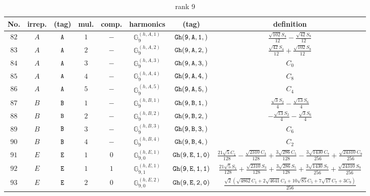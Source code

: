 \documentclass[fleqn,8pt]{jsarticle}
\begin{document}
\begin{table}[ht!]
\begin{center}
\caption{rank 9}
\renewcommand{\arraystretch}{1.3}
\begin{tabular}{cccccccc} \hline \hline
No. & irrep. & (tag) & mul. & comp. & harmonics & (tag) & definition \\ \hline
$ 82 $ & $ A $ & $ {\tt A} $ & $ 1 $ & $ - $ & $ \mathbb{G}_{9}^{(h,A,1)} $ & $ {\tt Gh(9,A,1,)} $ & $ \frac{\sqrt{102} S_{4}}{12} - \frac{\sqrt{42} S_{8}}{12} $ \\
$ 83 $ & $ A $ & $ {\tt A} $ & $ 2 $ & $ - $ & $ \mathbb{G}_{9}^{(h,A,2)} $ & $ {\tt Gh(9,A,2,)} $ & $ \frac{\sqrt{42} S_{4}}{12} + \frac{\sqrt{102} S_{8}}{12} $ \\
$ 84 $ & $ A $ & $ {\tt A} $ & $ 3 $ & $ - $ & $ \mathbb{G}_{9}^{(h,A,3)} $ & $ {\tt Gh(9,A,3,)} $ & $ C_{0} $ \\
$ 85 $ & $ A $ & $ {\tt A} $ & $ 4 $ & $ - $ & $ \mathbb{G}_{9}^{(h,A,4)} $ & $ {\tt Gh(9,A,4,)} $ & $ C_{8} $ \\
$ 86 $ & $ A $ & $ {\tt A} $ & $ 5 $ & $ - $ & $ \mathbb{G}_{9}^{(h,A,5)} $ & $ {\tt Gh(9,A,5,)} $ & $ C_{4} $ \\
$ 87 $ & $ B $ & $ {\tt B} $ & $ 1 $ & $ - $ & $ \mathbb{G}_{9}^{(h,B,1)} $ & $ {\tt Gh(9,B,1,)} $ & $ \frac{\sqrt{3} S_{2}}{4} - \frac{\sqrt{13} S_{6}}{4} $ \\
$ 88 $ & $ B $ & $ {\tt B} $ & $ 2 $ & $ - $ & $ \mathbb{G}_{9}^{(h,B,2)} $ & $ {\tt Gh(9,B,2,)} $ & $ - \frac{\sqrt{13} S_{2}}{4} - \frac{\sqrt{3} S_{6}}{4} $ \\
$ 89 $ & $ B $ & $ {\tt B} $ & $ 3 $ & $ - $ & $ \mathbb{G}_{9}^{(h,B,3)} $ & $ {\tt Gh(9,B,3,)} $ & $ C_{6} $ \\
$ 90 $ & $ B $ & $ {\tt B} $ & $ 4 $ & $ - $ & $ \mathbb{G}_{9}^{(h,B,4)} $ & $ {\tt Gh(9,B,4,)} $ & $ C_{2} $ \\
$ 91 $ & $ E $ & $ {\tt E} $ & $ 1 $ & $ 0 $ & $ \mathbb{G}_{9,0}^{(h,E,1)} $ & $ {\tt Gh(9,E,1,0)} $ & $ \frac{21 \sqrt{5} C_{1}}{128} - \frac{\sqrt{2310} C_{3}}{128} + \frac{3 \sqrt{286} C_{5}}{128} - \frac{3 \sqrt{1430} C_{7}}{256} + \frac{\sqrt{24310} C_{9}}{256} $ \\
$ 92 $ & $ E $ & $ {\tt E} $ & $ 1 $ & $ 1 $ & $ \mathbb{G}_{9,1}^{(h,E,1)} $ & $ {\tt Gh(9,E,1,1)} $ & $ \frac{21 \sqrt{5} S_{1}}{128} + \frac{\sqrt{2310} S_{3}}{128} + \frac{3 \sqrt{286} S_{5}}{128} + \frac{3 \sqrt{1430} S_{7}}{256} + \frac{\sqrt{24310} S_{9}}{256} $ \\
$ 93 $ & $ E $ & $ {\tt E} $ & $ 2 $ & $ 0 $ & $ \mathbb{G}_{9,0}^{(h,E,2)} $ & $ {\tt Gh(9,E,2,0)} $ & $ \frac{\sqrt{2} \left(\sqrt{4862} C_{1} + 2 \sqrt{4641} C_{3} + 10 \sqrt{85} C_{5} + 7 \sqrt{17} C_{7} + 3 C_{9}\right)}{256} $ \\

\end{tabular}
\end{center}
\end{table}
\end{document}
